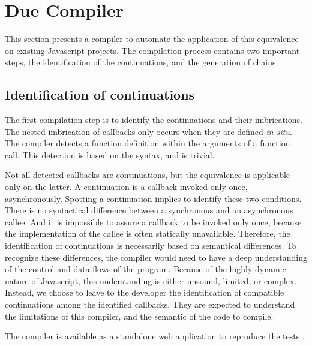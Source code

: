 \section{Due Compiler} \label{chapter5:due-compiler}

This section presents a compiler to automate the application of this equivalence on existing Javascript projects.
The compilation process contains two important steps, the identification of the continuations, and the generation of chains.

\subsection{Identification of continuations}

The first compilation step is to identify the continuations and their imbrications.
The nested imbrication of callbacks only occurs when they are defined \textit{in situ}.
The compiler detects a function definition within the arguments of a function call.
This detection is based on the syntax, and is trivial.


Not all detected callbacks are continuations, but the equivalence is applicable only on the latter.
A continuation is a callback invoked only once, asynchronously.
Spotting a continuation implies to identify these two conditions.
There is no syntactical difference between a synchronous and an asynchronous callee.
And it is impossible to assure a callback to be invoked only once, because the implementation of the callee is often statically unavailable.
Therefore, the identification of continuations is necessarily based on semantical differences.
To recognize these differences, the compiler would need to have a deep understanding of the control and data flows of the program.
Because of the highly dynamic nature of Javascript, this understanding is either unsound, limited, or complex.
Instead, we choose to leave to the developer the identification of compatible continuations among the identified callbacks.
They are expected to understand the limitations of this compiler, and the semantic of the code to compile.

The compiler is available as a standalone web application to reproduce the tests .

